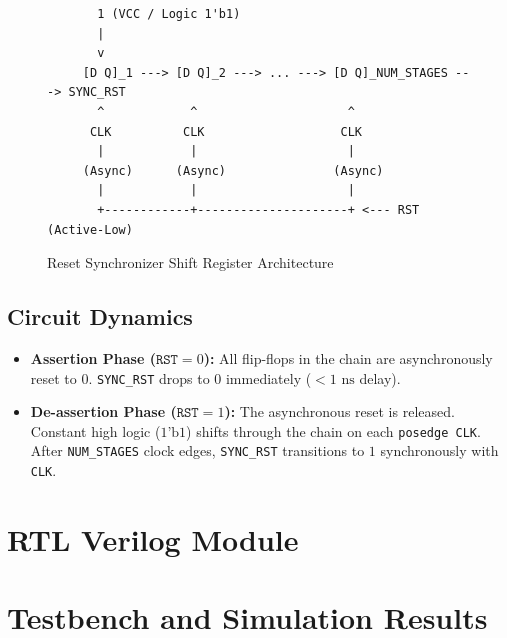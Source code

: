 \documentclass[12pt,a4paper]{article}
\begin{document}
\begin{figure}[H]
\centering
\begin{verbatim}
       1 (VCC / Logic 1'b1)
       |
       v
     [D Q]_1 ---> [D Q]_2 ---> ... ---> [D Q]_NUM_STAGES ---> SYNC_RST
       ^            ^                     ^
      CLK          CLK                   CLK
       |            |                     |
     (Async)      (Async)               (Async)
       |            |                     |
       +------------+---------------------+ <--- RST (Active-Low)
\end{verbatim}
\caption{Reset Synchronizer Shift Register Architecture}
\end{figure}

\subsection{Circuit Dynamics}
\begin{itemize}
    \item \textbf{Assertion Phase ($\texttt{RST} = 0$):} All flip-flops in the chain are asynchronously reset to $0$. \texttt{SYNC\_RST} drops to $0$ immediately ($< 1\text{ ns}$ delay).
    \item \textbf{De-assertion Phase ($\texttt{RST} = 1$):} The asynchronous reset is released. Constant high logic ($1\text{'b1}$) shifts through the chain on each \texttt{posedge CLK}. After \texttt{NUM\_STAGES} clock edges, \texttt{SYNC\_RST} transitions to $1$ synchronously with \texttt{CLK}.
\end{itemize}

\section{RTL Verilog Module}



\section{Testbench and Simulation Results}
\end{document}
